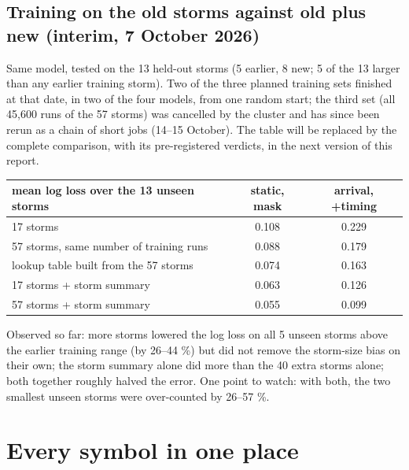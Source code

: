 \documentclass[11pt]{article}
\begin{document}
\subsection{Training on the old storms against old plus new (interim, 7 October 2026)}

Same model, tested on the 13 held-out storms (5 earlier, 8 new; 5 of the 13 larger than any earlier training storm). Two of the three planned training sets finished at that date, in two of the four models, from one random start; the third set (all 45,600 runs of the 57 storms) was cancelled by the cluster and has since been rerun as a chain of short jobs (14--15 October). The table will be replaced by the complete comparison, with its pre-registered verdicts, in the next version of this report.

\begin{center}\small
\begin{tabular}{@{}lcc@{}}
\toprule
mean log loss over the 13 unseen storms & static, mask & arrival, +timing\\
\midrule
17 storms & 0.108 & 0.229\\
57 storms, same number of training runs & 0.088 & 0.179\\
lookup table built from the 57 storms & 0.074 & 0.163\\
17 storms + storm summary & 0.063 & 0.126\\
57 storms + storm summary & 0.055 & 0.099\\
\bottomrule
\end{tabular}
\end{center}

Observed so far: more storms lowered the log loss on all 5 unseen storms above the earlier training range (by 26--44 \%) but did not remove the storm-size bias on their own; the storm summary alone did more than the 40 extra storms alone; both together roughly halved the error. One point to watch: with both, the two smallest unseen storms were over-counted by 26--57 \%.

\section{Every symbol in one place}\label{sec:symbols}
\end{document}
